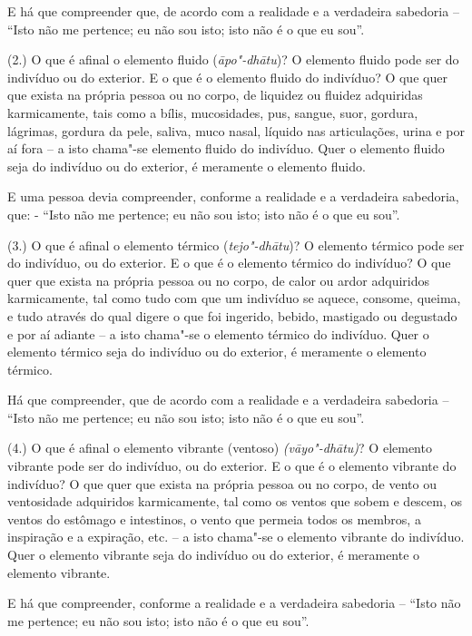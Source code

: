 E há que compreender que, de acordo com a realidade e a verdadeira sabedoria --
“Isto não me pertence; eu não sou isto; isto não é o que eu sou”.

(2.) O que é afinal o elemento fluido (\emph{āpo"-dhātu})? O elemento fluido pode
ser do indivíduo ou do exterior. E o que é o elemento fluido do indivíduo? O que
quer que exista na própria pessoa ou no corpo, de liquidez ou fluidez adquiridas
karmicamente, tais como a bílis, mucosidades, pus, sangue, suor, gordura,
lágrimas, gordura da pele, saliva, muco nasal, líquido nas articulações, urina e
por aí fora -- a isto chama"-se elemento fluido do indivíduo. Quer o elemento
fluido seja do indivíduo ou do exterior, é meramente o elemento fluido.

E uma pessoa devia compreender, conforme a realidade e a verdadeira sabedoria,
que: - “Isto não me pertence; eu não sou isto; isto não é o que eu sou”.

(3.) O que é afinal o elemento térmico (\emph{tejo"-dhātu})? O elemento térmico
pode ser do indivíduo, ou do exterior. E o que é o elemento térmico do
indivíduo? O que quer que exista na própria pessoa ou no corpo, de calor ou
ardor adquiridos karmicamente, tal como tudo com que um indivíduo se aquece,
consome, queima, e tudo através do qual digere o que foi ingerido, bebido,
mastigado ou degustado e por aí adiante -- a isto chama"-se o elemento térmico do
indivíduo. Quer o elemento térmico seja do indivíduo ou do exterior, é meramente
o elemento térmico.

Há que compreender, que de acordo com a realidade e a verdadeira sabedoria --
“Isto não me pertence; eu não sou isto; isto não é o que eu sou”.

\enlargethispage{\baselineskip}

(4.) O que é afinal o elemento vibrante (ventoso) \emph{(vāyo"-dhātu)}? O
elemento vibrante pode ser do indivíduo, ou do exterior. E o que é o elemento
vibrante do indivíduo? O que quer que exista na própria pessoa ou no corpo, de
vento ou ventosidade adquiridos karmicamente, tal como os ventos que sobem e
descem, os ventos do estômago e intestinos, o vento que permeia todos os
membros, a inspiração e a expiração, etc. -- a isto chama"-se o elemento vibrante
do indivíduo. Quer o elemento vibrante seja do indivíduo ou do exterior, é
meramente o elemento vibrante.

E há que compreender, conforme a realidade e a verdadeira sabedoria -- “Isto
não me pertence; eu não sou isto; isto não é o que eu sou”.

